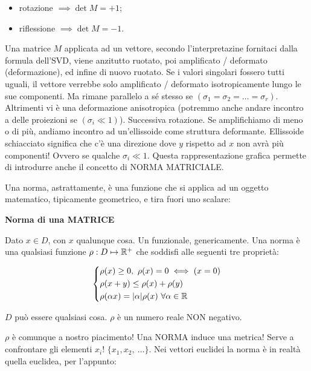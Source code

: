 \begin{itemize}

\item rotazione $\implies \det{M}=+1$;
\item riflessione $\implies \det{M}=-1$.
\end{itemize}

Una matrice $M$ applicata ad un vettore, secondo l'interpretazine fornitaci dalla formula dell'SVD, viene anzitutto ruotato, poi amplificato / deformato (deformazione), ed infine di nuovo ruotato. Se i valori singolari fossero tutti uguali, il vettore verrebbe solo amplificato / deformato isotropicamente lungo le sue componenti. Ma rimane parallelo a sé stesso se $(\sigma_1=\sigma_2=\dots=\sigma_r)$. Altrimenti vi è una deformazione anisotropica (potremmo anche andare incontro a delle proiezioni se $(\sigma_i\ll 1)$). Successiva rotazione. Se amplifichiamo di meno o di più, andiamo incontro ad un'ellissoide come struttura deformante. Ellissoide schiacciato significa che c'è una direzione dove $y$ rispetto ad $x$ non avrà più componenti! Ovvero se qualche $\sigma_i\ll 1$. Questa rappresentazione grafica permette di introdurre anche il concetto di NORMA MATRICIALE.

Una norma, astrattamente, è una funzione che si applica ad un oggetto matematico, tipicamente geometrico, e tira fuori uno scalare:

\begin{defn}{\textbf{Norma di una MATRICE}}

Dato $x\in D$, con $x$ qualunque cosa. Un funzionale, genericamente. Una norma è una qualsiasi funzione $\rho:D\mapsto\mathbb{R}^+$ che soddisfi alle seguenti tre proprietà:

\[
	\left\{
	\begin{aligned}
	&\rho(x)\geq 0,\ \rho(x)=0\iff (x=0)\\
	&\rho(x+y)\leq \rho(x)+\rho(y)\\
	&\rho(\alpha x) = \lvert\alpha\rvert\rho(x)\ \forall\alpha\in\mathbb{R}
	\end{aligned}
	\right.
\]

$D$ può essere qualsiasi cosa. $\rho$ è un numero reale NON negativo.

\end{defn}

$\rho$ è comunque a nostro piacimento! Una NORMA induce una metrica! Serve a confrontare gli elementi $x_i$! $\{x_1,x_2,\ \dots\}$. Nei vettori euclidei la norma è in realtà quella euclidea, per l'appunto:

